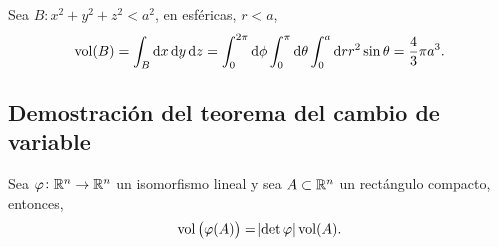 \begin{example}
    Sea $B: x^2 + y^2 + z^2 < a^2$, en esf\'ericas, $r < a$,
    \[
        \vol(B) = \int_B \dif x \dif y \dif z = \int^{2\pi}_0 \dif \phi \int^\pi_0 \dif \theta \int^{a}_0  \dif r r^2 \sin\theta
        = \frac{4}{3} \pi a^3.
    \]
\end{example}

\subsection*{Demostración del teorema del cambio de variable}

\begin{lema}[(1)]\label{lema:uno_cambio}
    Sea $\varphi \colon \mathbb{R}^n \to \mathbb{R}^n$ un isomorfismo lineal y sea $A \subset \mathbb{R}^n$ un rectángulo compacto, entonces,
    \[
        \operatorname{vol}\left( \varphi(A) \right) = \abs{\det \varphi} \operatorname{vol}(A).
    \]
\end{lema}

